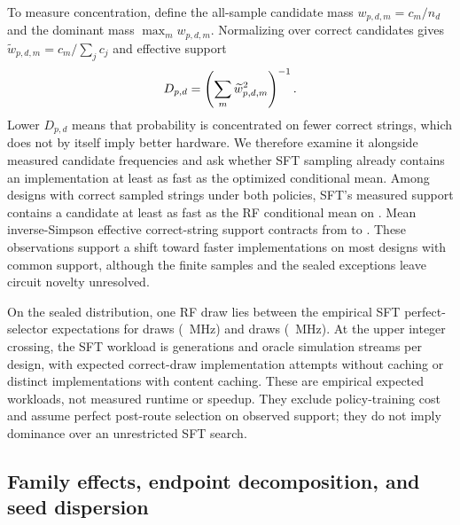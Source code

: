 To measure concentration, define the all-sample candidate mass
$w_{p,d,m}=c_m/n_d$ and the dominant mass $\max_m w_{p,d,m}$.  Normalizing over
correct candidates gives $\widetilde{w}_{p,d,m}=c_m/\sum_jc_j$ and effective
support
\begin{equation}
D_{p,d}=\left(\sum_m\widetilde{w}_{p,d,m}^{2}\right)^{-1}.
\label{eq:effective-support}
\end{equation}
Lower $D_{p,d}$ means that probability is concentrated on fewer correct strings,
which does not by itself imply better hardware. We therefore examine it
alongside measured candidate frequencies and ask whether SFT sampling already
contains an implementation at least as fast as the optimized conditional mean.
Among  designs with
correct sampled strings under both policies, SFT's measured support contains a
candidate at least as fast as the RF conditional mean on
.  Mean inverse-Simpson
effective correct-string support contracts from
 to
. These observations support a
shift toward faster implementations on most designs with common support,
although the finite samples and the sealed exceptions leave circuit novelty
unresolved.

On the sealed distribution, one RF draw lies between the empirical SFT
perfect-selector expectations for  draws
(~MHz) and
 draws
(~MHz).  At the upper integer crossing, the
SFT workload is  generations and
 oracle simulation streams per design, with
 expected correct-draw implementation
attempts without caching or 
distinct implementations with content caching.  These are empirical expected
workloads, not measured runtime or speedup.  They exclude policy-training cost
and assume perfect post-route selection on observed support; they do not imply
dominance over an unrestricted SFT search.

\subsection{Family effects, endpoint decomposition, and seed dispersion}


